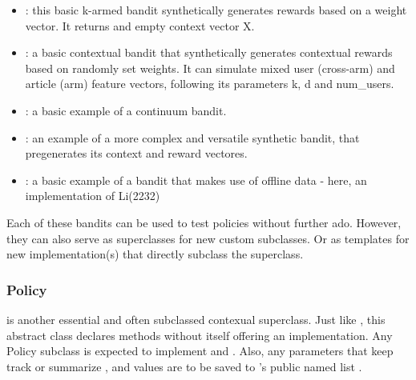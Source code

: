 \documentclass[nojss]{jss}\usepackage[]{graphicx}\usepackage[]{color}
\begin{document}
\begin{itemize}
         \item {}: this basic k-armed bandit synthetically generates rewards based on a weight vector. It returns and empty context vector X.
         \item {}: a basic contextual bandit that synthetically generates contextual rewards based on randomly set weights. It can simulate mixed user (cross-arm) and article (arm) feature vectors, following its parameters k, d and num\_users.
         \item {}: a basic example of a continuum bandit.
         \item {}: an example of a more complex and versatile synthetic bandit, that pregenerates its context and reward vectores.
         \item {}: a basic example of a bandit that makes use of offline data - here, an implementation of Li(2232)
\end{itemize}

Each of these bandits can be used to test policies without further ado. However, they can also serve as superclasses for new custom  subclasses. Or as templates for new  implementation(s) that directly subclass the  superclass.

\subsubsection{Policy}

 is another essential and often subclassed contexual superclass. Just like , this abstract class declares methods without itself offering an implementation. Any Policy subclass is expected to implement  and . Also, any parameters that keep track or summarize ,  and  values are to be saved to 's public named list .
\end{document}
